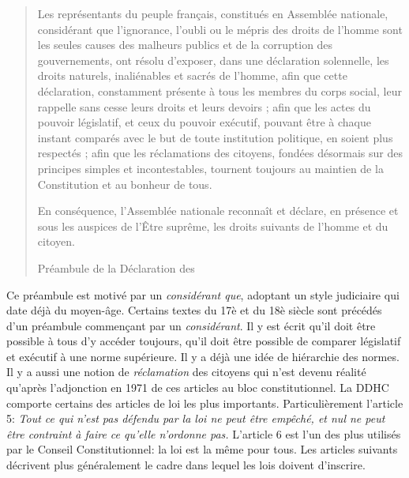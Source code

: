 \documentclass[math]{cours}
\begin{document}
\begin{quote}
	Les représentants du peuple français, constitués en Assemblée nationale, considérant que l'ignorance, l'oubli ou le mépris des droits de l'homme sont les seules causes des malheurs publics et de la corruption des gouvernements, ont résolu d'exposer, dans une déclaration solennelle, les droits naturels, inaliénables et sacrés de l'homme, afin que cette déclaration, constamment présente à tous les membres du corps social, leur rappelle sans cesse leurs droits et leurs devoirs ; afin que les actes du pouvoir législatif, et ceux du pouvoir exécutif, pouvant être à chaque instant comparés avec le but de toute institution politique, en soient plus respectés ; afin que les réclamations des citoyens, fondées désormais sur des principes simples et incontestables, tournent toujours au maintien de la Constitution et au bonheur de tous.
\smallskip

En conséquence, l'Assemblée nationale reconnaît et déclare, en présence et sous les auspices de l'Être suprême, les droits suivants de l'homme et du citoyen.
\begin{flushright}
	Préambule de la Déclaration des
\end{flushright}

\end{quote}
Ce préambule est motivé par un \emph{considérant que}, adoptant un style judiciaire qui date déjà du moyen-âge.
Certains textes du 17è et du 18è siècle sont précédés d'un préambule commençant par un \emph{considérant}.
Il y est écrit qu'il doit être possible à tous d'y accéder toujours, qu'il doit être possible de comparer législatif et exécutif à une norme supérieure.
Il y a déjà une idée de hiérarchie des normes.
Il y a aussi une notion de \emph{réclamation} des citoyens qui n'est devenu réalité qu'après l'adjonction en 1971 de ces articles au bloc constitutionnel.
La DDHC comporte certains des articles de loi les plus importants. Particulièrement l'article 5: \og\emph{Tout ce qui n'est pas défendu par la loi ne peut être empêché, et nul ne peut être contraint à faire ce qu'elle n'ordonne pas.}\fg
L'article 6 est l'un des plus utilisés par le Conseil Constitutionnel: la loi est la même pour tous.
Les articles suivants décrivent plus généralement le cadre dans lequel les lois doivent d'inscrire.
\end{document}
